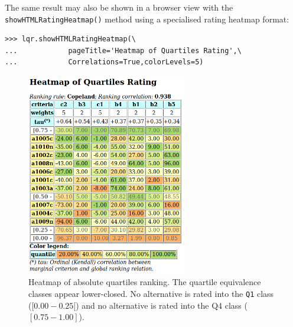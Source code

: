 The same result may also be shown in a browser view with the \texttt{showHTMLRa\-tingHeatmap()} method using a specialised rating heatmap format: 
\begin{lstlisting}
>>> lqr.showHTMLRatingHeatmap(\
...            pageTitle='Heatmap of Quartiles Rating',\
...            Correlations=True,colorLevels=5)
\end{lstlisting}
\begin{figure}[h]
\sidecaption[t]
 \includegraphics[width=7cm]{Figures/heatMap1.png}
\caption{Heatmap of absolute quartiles ranking. The quartile equivalence classes appear lower-closed. No alternative is rated into the \texttt{Q1} class ($[0.00 - 0.25[$) and no alternative is rated into the Q4 class ($[0.75 - 1.00]$). }
\label{fig:10.2}       %
\end{figure}
	    
